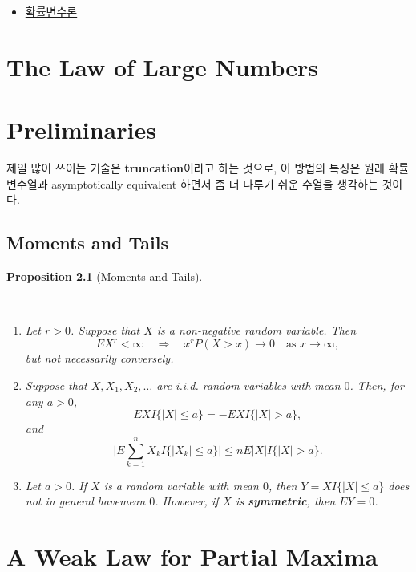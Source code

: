 \documentclass[
  letterpaper,
  DIV=11,
  numbers=noendperiod]{scrreprt}
\providecommand{\tightlist}{%
  \setlength{\itemsep}{0pt}\setlength{\parskip}{0pt}}\usepackage{longtable,booktabs,array}
\theoremstyle{plain}
\theoremstyle{definition}
\theoremstyle{definition}
\theoremstyle{plain}
\newtheorem{proposition}{Proposition}[chapter]
\theoremstyle{plain}
\theoremstyle{remark}
\begin{document}
\begin{itemize}
\tightlist
\item
  \href{https://product.kyobobook.co.kr/detail/S000001075892}{확률변수론}
\end{itemize}

\chapter{The Law of Large Numbers}\label{the-law-of-large-numbers}

\chapter{Preliminaries}\label{preliminaries}

제일 많이 쓰이는 기술은 \textbf{truncation}이라고 하는 것으로, 이 방법의
특징은 원래 확률변수열과 asymptotically equivalent 하면서 좀 더 다루기
쉬운 수열을 생각하는 것이다.

\section{Moments and Tails}\label{moments-and-tails}

\begin{proposition}[Moments and
Tails]\protect\hypertarget{prp-momentsandtails}{}\label{prp-momentsandtails}

~

\begin{enumerate}
\def\labelenumi{\arabic{enumi}.}
\item
  Let \(r>0\). Suppose that \(X\) is a non-negative random variable.
  Then \[
  EX^r < \infty \quad{}\Longrightarrow \quad{} x^r P(X>x) \rightarrow 0 \quad{} \text{as }x \rightarrow \infty,
  \] but not necessarily conversely.
\item
  Suppose that \(X, X_1, X_2, \ldots\) are i.i.d. random variables with
  mean \(0\). Then, for any \(a >0\), \[
  EXI\{ |X| \leq a\}= - EXI\{ |X|>a\},
  \] and \[
  \Big| E \sum_{k=1}^n X_k I\{ |X_k| \leq a\} \Big|\leq n E|X| I\{|X|>a\}.
  \]
\item
  Let \(a >0\). If \(X\) is a random variable with mean \(0\), then
  \(Y=XI\{|X|\leq a\}\) does not in general havemean \(0\). However, if
  \(X\) is \textbf{symmetric}, then \(EY=0\).
\end{enumerate}

\end{proposition}

\chapter{A Weak Law for Partial
Maxima}\label{a-weak-law-for-partial-maxima}
\end{document}
